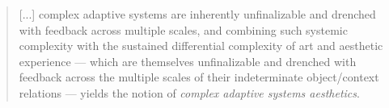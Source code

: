                 \begin{quote}
                    [...] complex adaptive systems are inherently unfinalizable and drenched with feedback across multiple scales, and combining such systemic complexity with the sustained differential complexity of art and aesthetic experience — which are themselves unfinalizable and drenched with feedback across the multiple scales of their indeterminate object/context relations — yields the notion of \emph{complex adaptive systems aesthetics}.
                \end{quote}